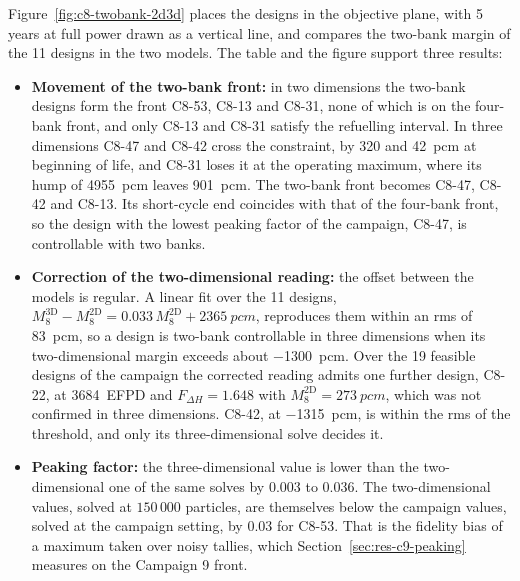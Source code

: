Figure~\ref{fig:c8-twobank-2d3d} places the designs in the objective
plane, with 5 years at full power drawn as a vertical line, and
compares the two-bank margin of the 11 designs in the two models.
The table and the figure support three results:

\begin{itemize}
  \item \textbf{Movement of the two-bank front:} in two dimensions the
        two-bank designs form the front C8-53, C8-13 and C8-31, none of
        which is on the four-bank front, and only C8-13 and C8-31
        satisfy the refuelling interval. In three dimensions C8-47 and
        C8-42 cross the constraint, by 320 and \SI{42}{pcm} at beginning
        of life, and C8-31 loses it at the operating maximum, where its
        hump of \SI{4955}{pcm} leaves \SI{901}{pcm}. The two-bank front
        becomes C8-47, C8-42 and C8-13. Its short-cycle end coincides
        with that of the four-bank front, so the design with the lowest
        peaking factor of the campaign, C8-47, is controllable with two
        banks.

  \item \textbf{Correction of the two-dimensional reading:} the offset
        between the models is regular. A linear fit over the 11
        designs, $M_8^\mathrm{3D} - M_8^\mathrm{2D} = 0.033\,M_8^\mathrm{2D}
        + \SI{2365}{pcm}$, reproduces them within an rms of
        \SI{83}{pcm}, so a design is two-bank controllable in three
        dimensions when its two-dimensional margin exceeds about
        \SI{-1300}{pcm}. Over the 19 feasible designs of the campaign the corrected reading admits one further design, C8-22, at
        \SI{3684}{EFPD} and $F_{\Delta H} = 1.648$ with
        $M_8^\mathrm{2D} = \SI{+273}{pcm}$, which was not confirmed in
        three dimensions. C8-42, at \SI{-1315}{pcm}, is within the rms
        of the threshold, and only its three-dimensional solve decides
        it.

  \item \textbf{Peaking factor:} the three-dimensional value is lower
        than the two-dimensional one of the same solves by 0.003 to
        0.036. The two-dimensional values, solved at $150\,000$
        particles, are themselves below the campaign values, solved at the campaign setting, by 0.03 for C8-53. That is the fidelity bias of
        a maximum taken over noisy tallies, which
        Section~\ref{sec:res-c9-peaking} measures on the Campaign 9
        front.
\end{itemize}

